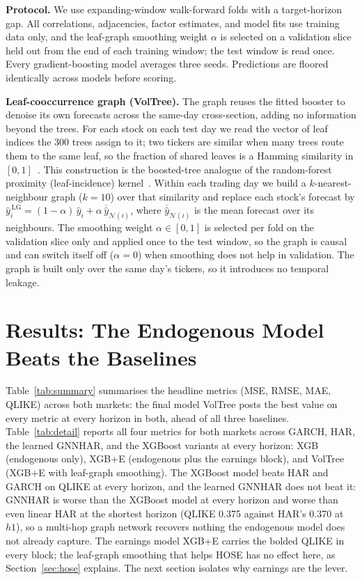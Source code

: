 \documentclass[runningheads]{llncs}
\begin{document}
\textbf{Protocol.} We use expanding-window walk-forward folds with a target-horizon gap. All
correlations, adjacencies, factor estimates, and model fits use training data only, and the leaf-graph
smoothing weight $\alpha$ is selected on a validation slice held out from the end of each training window;
the test window is read once. Every gradient-boosting model averages three seeds. Predictions are floored identically
across models before scoring.

\textbf{Leaf-cooccurrence graph (VolTree).} The graph reuses the fitted booster to denoise its own
forecasts across the same-day cross-section, adding no information beyond the trees. For each stock on
each test day we read the vector of leaf indices the 300 trees assign to it; two tickers are similar
when many trees route them to the same leaf, so the fraction of shared leaves is a Hamming similarity
in $[0,1]$~\cite{chen2016}. This construction is the boosted-tree analogue of the random-forest
proximity (leaf-incidence) kernel~\cite{rhodes2023}. Within each trading day we build a $k$-nearest-neighbour
graph ($k=10$) over that similarity and replace each stock's forecast by
$\hat y_i^{\,\mathrm{LG}}=(1-\alpha)\,\hat y_i+\alpha\,\overline{\hat y}_{\mathcal{N}(i)}$, where
$\overline{\hat y}_{\mathcal{N}(i)}$ is the mean forecast over its neighbours. The smoothing weight
$\alpha\in[0,1]$ is selected per fold on the validation slice only and applied once to the test
window, so the graph is causal and can switch itself off ($\alpha=0$) when smoothing does not help in
validation. The graph is built only over the same day's tickers, so it introduces no temporal leakage.

\section{Results: The Endogenous Model Beats the Baselines}\label{sec:graph}
Table~\ref{tab:summary} summarises the headline metrics (MSE, RMSE, MAE, QLIKE) across both markets: the final model VolTree posts the best value on every metric at every horizon in both, ahead of all three baselines. Table~\ref{tab:detail} reports all four metrics for both markets across GARCH, HAR, the learned
GNNHAR, and the XGBoost variants at every horizon: XGB (endogenous only), XGB+E (endogenous plus the
earnings block), and VolTree (XGB+E with leaf-graph smoothing). The XGBoost model beats HAR
and GARCH on QLIKE at every horizon, and the learned GNNHAR does not beat it: GNNHAR is worse than the
XGBoost model at every horizon and worse than even linear HAR at the shortest horizon (QLIKE 0.375
against HAR's 0.370 at $h1$), so a multi-hop graph network recovers nothing the endogenous model does
not already capture. The earnings model XGB+E carries the bolded QLIKE in every block; the leaf-graph
smoothing that helps HOSE has no effect here, as Section~\ref{sec:hose} explains. The next section isolates
why earnings are the lever.
\end{document}
